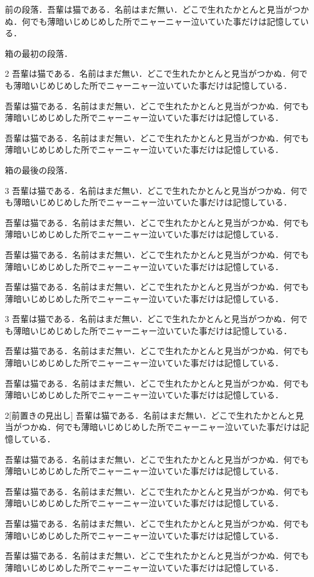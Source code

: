 \documentclass[twocolumn]{jlreq}
\newcommand\para{吾輩は猫である．名前はまだ無い．どこで生れたかとんと見当がつかぬ．何でも薄暗いじめじめした所でニャーニャー泣いていた事だけは記憶している．\par}
\begin{document}
前の段落．\para
\begin{tcolorbox}[title=tcolorboxの中の2段]
箱の最初の段落．
\begin{multicols}{2}
\para\para\para
\end{multicols}
箱の最後の段落．
\end{tcolorbox}
\begin{tcolorbox}[title=3段，段間1字，罫なし]
\begin{evenendmulticols}[columnsep=1\zw,columnseprule=0pt]{3}
\para\para\para\para
\end{evenendmulticols}
\end{tcolorbox}
\begin{tcolorbox}[title=columnbreak]
\begin{multicols}{3}
\para\columnbreak\para\para
\end{multicols}
\end{tcolorbox}
\noindent\begin{minipage}{.6\linewidth}
\begin{multicols}{2}[前置きの見出し]
\para\para
\end{multicols}
\end{minipage}
\para\para\para
\end{document}
